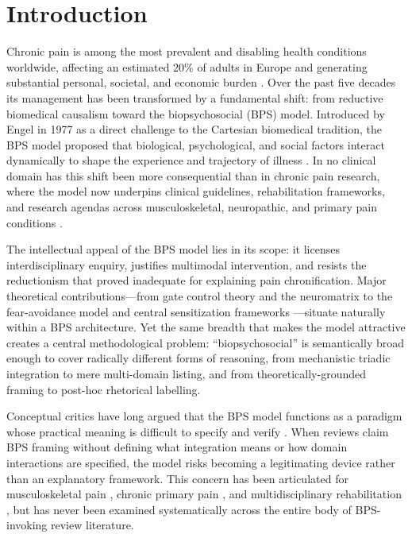 \documentclass[11pt]{article}
\begin{document}
\section{Introduction}
\label{sec:intro}

Chronic pain is among the most prevalent and disabling health conditions worldwide, affecting an estimated 20\% of adults in Europe and generating substantial personal, societal, and economic burden \citep{breivik2006, rice2016, vos2016}. Over the past five decades its management has been transformed by a fundamental shift: from reductive biomedical causalism toward the biopsychosocial (BPS) model. Introduced by Engel in 1977 as a direct challenge to the Cartesian biomedical tradition, the BPS model proposed that biological, psychological, and social factors interact dynamically to shape the experience and trajectory of illness \citep{engel1977, engel1980}. In no clinical domain has this shift been more consequential than in chronic pain research, where the model now underpins clinical guidelines, rehabilitation frameworks, and research agendas across musculoskeletal, neuropathic, and primary pain conditions \citep{gatchel2007, kamper2015, nicholas2019}.

The intellectual appeal of the BPS model lies in its scope: it licenses interdisciplinary enquiry, justifies multimodal intervention, and resists the reductionism that proved inadequate for explaining pain chronification. Major theoretical contributions---from gate control theory \citep{melzack1965} and the neuromatrix \citep{melzack1999} to the fear-avoidance model \citep{vlaeyen2000} and central sensitization frameworks \citep{woolf2011}---situate naturally within a BPS architecture. Yet the same breadth that makes the model attractive creates a central methodological problem: ``biopsychosocial'' is semantically broad enough to cover radically different forms of reasoning, from mechanistic triadic integration to mere multi-domain listing, and from theoretically-grounded framing to post-hoc rhetorical labelling.

Conceptual critics have long argued that the BPS model functions as a paradigm whose practical meaning is difficult to specify and verify \citep{borrell2004, wade2017, crombez2015}. When reviews claim BPS framing without defining what integration means or how domain interactions are specified, the model risks becoming a legitimating device rather than an explanatory framework. This concern has been articulated for musculoskeletal pain \citep{hartvigsen2018, foster2018}, chronic primary pain \citep{treede2019}, and multidisciplinary rehabilitation \citep{flor1992}, but has never been examined systematically across the entire body of BPS-invoking review literature.
\end{document}
